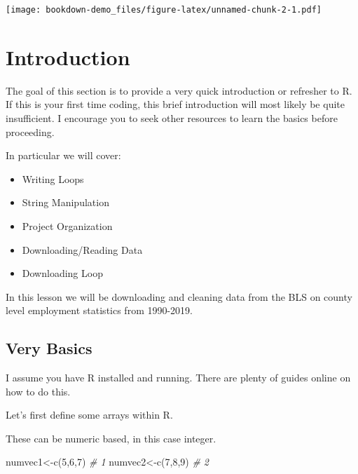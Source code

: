 \documentclass[
]{book}
\newenvironment{Shaded}{\begin{snugshade}}{\end{snugshade}}
\newcommand{\CommentTok}[1]{\textcolor[rgb]{0.56,0.35,0.01}{\textit{#1}}}
\newcommand{\DecValTok}[1]{\textcolor[rgb]{0.00,0.00,0.81}{#1}}
\newcommand{\FunctionTok}[1]{\textcolor[rgb]{0.00,0.00,0.00}{#1}}
\newcommand{\NormalTok}[1]{#1}
\newcommand{\OtherTok}[1]{\textcolor[rgb]{0.56,0.35,0.01}{#1}}
\providecommand{\tightlist}{%
  \setlength{\itemsep}{0pt}\setlength{\parskip}{0pt}}
\begin{document}
\texttt{[image: bookdown-demo\_files/figure-latex/unnamed-chunk-2-1.pdf]}

\hypertarget{intro}{%
\chapter{Introduction}\label{intro}}

The goal of this section is to provide a very quick introduction or refresher to R. If this is your first time coding, this brief introduction will most likely be quite insufficient. I encourage you to seek other resources to learn the basics before proceeding.

In particular we will cover:

\begin{itemize}
\tightlist
\item
  Writing Loops
\item
  String Manipulation
\item
  Project Organization
\item
  Downloading/Reading Data
\item
  Downloading Loop
\end{itemize}

In this lesson we will be downloading and cleaning data from the BLS on county level employment statistics from 1990-2019.

\hypertarget{very-basics}{%
\section{Very Basics}\label{very-basics}}

I assume you have R installed and running. There are plenty of guides online on how to do this.

Let's first define some arrays within R.

These can be numeric based, in this case integer.

\begin{Shaded}
\begin{Highlighting}[numbers=left,,]
\NormalTok{numvec1}\OtherTok{\textless{}{-}}\FunctionTok{c}\NormalTok{(}\DecValTok{5}\NormalTok{,}\DecValTok{6}\NormalTok{,}\DecValTok{7}\NormalTok{)  }\CommentTok{\# 1}
\NormalTok{numvec2}\OtherTok{\textless{}{-}}\FunctionTok{c}\NormalTok{(}\DecValTok{7}\NormalTok{,}\DecValTok{8}\NormalTok{,}\DecValTok{9}\NormalTok{)  }\CommentTok{\# 2}
\end{Highlighting}
\end{Shaded}
\end{document}
